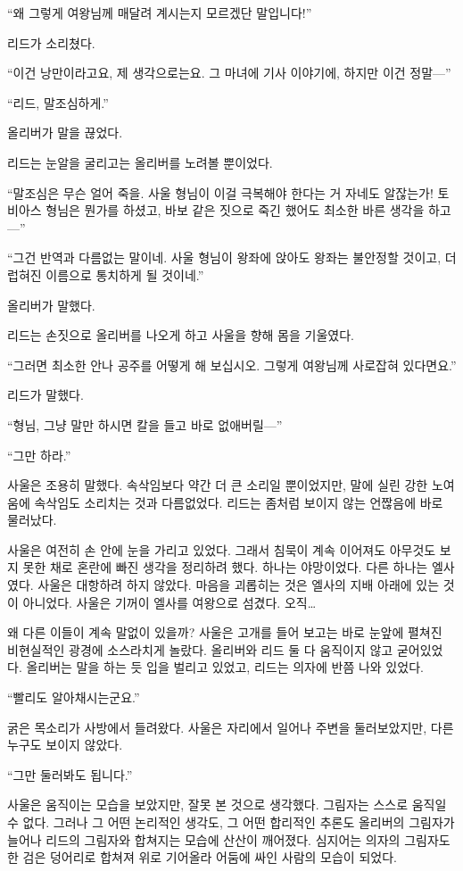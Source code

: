 ``왜 그렇게 여왕님께 매달려 계시는지 모르겠단 말입니다!''

리드가 소리쳤다.

``이건 낭만이라고요, 제 생각으로는요. 그 마녀에 기사 이야기에, 하지만 이건 정말—''

``리드, 말조심하게.''

올리버가 말을 끊었다.

리드는 눈알을 굴리고는 올리버를 노려볼 뿐이었다.

``말조심은 무슨 얼어 죽을. 사울 형님이 이걸 극복해야 한다는 거 자네도 알잖는가! 토비아스 형님은 뭔가를 하셨고, 바보 같은 짓으로 죽긴 했어도 최소한 바른 생각을 하고—''

``그건 반역과 다름없는 말이네. 사울 형님이 왕좌에 앉아도 왕좌는 불안정할 것이고, 더럽혀진 이름으로 통치하게 될 것이네.''

올리버가 말했다.

리드는 손짓으로 올리버를 나오게 하고 사울을 향해 몸을 기울였다.

``그러면 최소한 안나 공주를 어떻게 해 보십시오. 그렇게 여왕님께 사로잡혀 있다면요.''

리드가 말했다.

``형님, 그냥 말만 하시면 칼을 들고 바로 없애버릴—''

``그만 하라.''

사울은 조용히 말했다. 속삭임보다 약간 더 큰 소리일 뿐이었지만, 말에 실린 강한 노여움에 속삭임도 소리치는 것과 다름없었다. 리드는 좀처럼 보이지 않는 언짢음에 바로 물러났다.

사울은 여전히 손 안에 눈을 가리고 있었다. 그래서 침묵이 계속 이어져도 아무것도 보지 못한 채로 혼란에 빠진 생각을 정리하려 했다. 하나는 야망이었다. 다른 하나는 엘사였다. 사울은 대항하려 하지 않았다. 마음을 괴롭히는 것은 엘사의 지배 아래에 있는 것이 아니었다. 사울은 기꺼이 엘사를 여왕으로 섬겼다. 오직\ldots

왜 다른 이들이 계속 말없이 있을까? 사울은 고개를 들어 보고는 바로 눈앞에 펼쳐진 비현실적인 광경에 소스라치게 놀랐다. 올리버와 리드 둘 다 움직이지 않고 굳어있었다. 올리버는 말을 하는 듯 입을 벌리고 있었고, 리드는 의자에 반쯤 나와 있었다.

``빨리도 알아채시는군요.''

굵은 목소리가 사방에서 들려왔다. 사울은 자리에서 일어나 주변을 둘러보았지만, 다른 누구도 보이지 않았다.

``그만 둘러봐도 됩니다.''

사울은 움직이는 모습을 보았지만, 잘못 본 것으로 생각했다. 그림자는 스스로 움직일 수 없다. 그러나 그 어떤 논리적인 생각도, 그 어떤 합리적인 추론도 올리버의 그림자가 늘어나 리드의 그림자와 합쳐지는 모습에 산산이 깨어졌다. 심지어는 의자의 그림자도 한 검은 덩어리로 합쳐져 위로 기어올라 어둠에 싸인 사람의 모습이 되었다.

